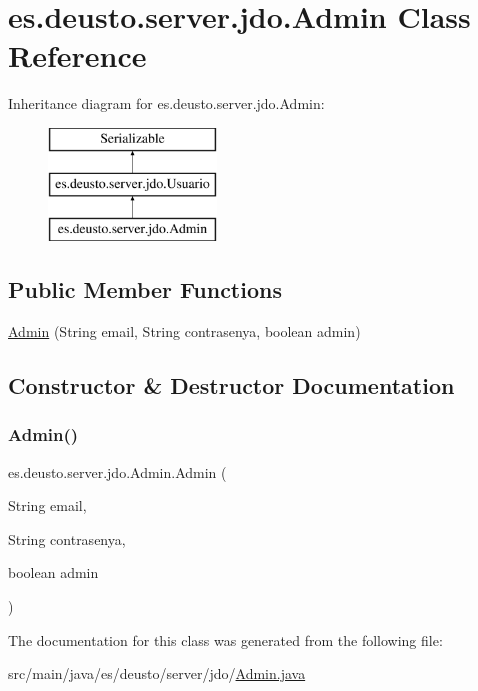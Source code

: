 \hypertarget{classes_1_1deusto_1_1server_1_1jdo_1_1_admin}{}\section{es.\+deusto.\+server.\+jdo.\+Admin Class Reference}
\label{classes_1_1deusto_1_1server_1_1jdo_1_1_admin}
Inheritance diagram for es.\+deusto.\+server.\+jdo.\+Admin\+:\begin{figure}[H]
\begin{center}
\leavevmode
\includegraphics[height=3.000000cm]{classes_1_1deusto_1_1server_1_1jdo_1_1_admin}
\end{center}
\end{figure}
\subsection*{Public Member Functions}
\begin{DoxyCompactItemize}
\item 
\mbox{\hyperlink{classes_1_1deusto_1_1server_1_1jdo_1_1_admin_abe99472772753762e542ae17d4cdf4ad}{Admin}} (String email, String contrasenya, boolean admin)
\end{DoxyCompactItemize}


\subsection{Constructor \& Destructor Documentation}
\mbox{\label{classes_1_1deusto_1_1server_1_1jdo_1_1_admin_abe99472772753762e542ae17d4cdf4ad}} 
\subsubsection{\texorpdfstring{Admin()}{Admin()}}
{\footnotesize\ttfamily es.\+deusto.\+server.\+jdo.\+Admin.\+Admin (\begin{DoxyParamCaption}\item[{String}]{email,  }\item[{String}]{contrasenya,  }\item[{boolean}]{admin }\end{DoxyParamCaption})}



The documentation for this class was generated from the following file\+:\begin{DoxyCompactItemize}
\item 
src/main/java/es/deusto/server/jdo/\mbox{\hyperlink{_admin_8java}{Admin.\+java}}\end{DoxyCompactItemize}
